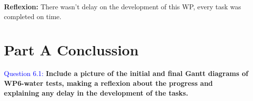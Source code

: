 \documentclass[12pt, a4papre]{article}
\begin{document}
	\textbf{Reflexion: } There wasn’t delay on the development of this WP, every task was completed on time.	
	
	\section{Part A Conclussion}
	
	\textcolor{blue}{Question 6.1:} \textbf{Include a picture of the initial and final Gantt diagrams of WP6-water tests, making a reflexion about the progress and explaining any delay in the development of the tasks.}
	
	
	

	
\end{document}
